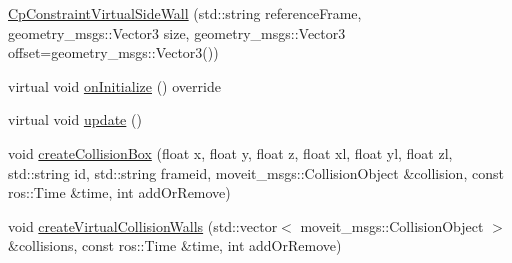 \begin{DoxyCompactItemize}
\item 
\hyperlink{classsm__moveit__wine__serve_1_1cl__move__group__interface_1_1CpConstraintVirtualSideWall_a6767e71e2169b71d969d04fa93b88613}{Cp\+Constraint\+Virtual\+Side\+Wall} (std\+::string reference\+Frame, geometry\+\_\+msgs\+::\+Vector3 size, geometry\+\_\+msgs\+::\+Vector3 offset=geometry\+\_\+msgs\+::\+Vector3())
\item 
virtual void \hyperlink{classsm__moveit__wine__serve_1_1cl__move__group__interface_1_1CpConstraintVirtualSideWall_ac15d37921d1969b4be0f5ea3e2345c24}{on\+Initialize} () override
\item 
virtual void \hyperlink{classsm__moveit__wine__serve_1_1cl__move__group__interface_1_1CpConstraintVirtualSideWall_a7cdb83affb53be16e9d2961aa8361e22}{update} ()
\item 
void \hyperlink{classsm__moveit__wine__serve_1_1cl__move__group__interface_1_1CpConstraintVirtualSideWall_a52617a140c7a19b4f0a08804c3a8d3a6}{create\+Collision\+Box} (float x, float y, float z, float xl, float yl, float zl, std\+::string id, std\+::string frameid, moveit\+\_\+msgs\+::\+Collision\+Object \&collision, const ros\+::\+Time \&time, int add\+Or\+Remove)
\item 
void \hyperlink{classsm__moveit__wine__serve_1_1cl__move__group__interface_1_1CpConstraintVirtualSideWall_a98576104cf4c349341031848477b2d5b}{create\+Virtual\+Collision\+Walls} (std\+::vector$<$ moveit\+\_\+msgs\+::\+Collision\+Object $>$ \&collisions, const ros\+::\+Time \&time, int add\+Or\+Remove)
\end{DoxyCompactItemize}
